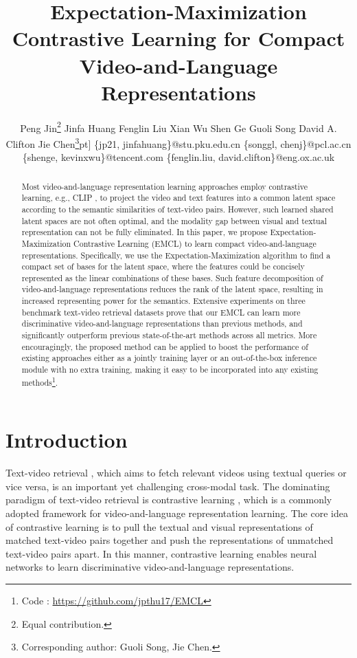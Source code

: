 \documentclass{article}
\title{Expectation-Maximization Contrastive Learning for Compact Video-and-Language Representations}
\author{Peng Jin\thanks{Equal contribution.} \quad
    Jinfa Huang \quad
    Fenglin Liu \quad
    Xian Wu \quad
    Shen Ge \quad
    Guoli Song
    \And
    David A. Clifton \quad
    Jie Chen\thanks{Corresponding author: Guoli Song, Jie Chen.}\5pt]
    \{jp21, jinfahuang\}@stu.pku.edu.cn \quad \{songgl, chenj\}@pcl.ac.cn\\
    \{shenge, kevinxwu\}@tencent.com \quad \{fenglin.liu, david.clifton\}@eng.ox.ac.uk
}
\begin{document}
\newcommand*{\dif}{\,\mathrm{d}}
\renewcommand{\thefootnote}{\fnsymbol{footnote}}
\setcounter{footnote}{0}
\maketitle

\begin{abstract}
Most video-and-language representation learning approaches employ contrastive learning, e.g., CLIP \cite{radford2021learning}, to project the video and text features into a common latent space according to the semantic similarities of text-video pairs. However, such learned shared latent spaces are not often optimal, and the modality gap between visual and textual representation can not be fully eliminated. In this paper, we propose Expectation-Maximization Contrastive Learning (EMCL) to learn compact video-and-language representations. Specifically, we use the Expectation-Maximization algorithm to find a compact set of bases for the latent space, where the features could be concisely represented as the linear combinations of these bases. Such feature decomposition of video-and-language representations reduces the rank of the latent space, resulting in increased representing power for the semantics. Extensive experiments on three benchmark text-video retrieval datasets prove that our EMCL can learn more discriminative video-and-language representations than previous methods, and significantly outperform previous state-of-the-art methods across all metrics. More encouragingly, the proposed method can be applied to boost the performance of existing approaches either as a jointly training layer or an out-of-the-box inference module with no extra training, making it easy to be incorporated into any existing methods\footnote[3]{Code : \href{https://github.com/jpthu17/EMCL}{https://github.com/jpthu17/EMCL}}.
\end{abstract}


\section{Introduction}
Text-video retrieval \cite{Yu2017Retrieval}, which aims to fetch relevant videos using textual queries or vice versa, is an important yet challenging cross-modal task. The dominating paradigm of text-video retrieval is contrastive learning \cite{wu2018unsupervised,hjelm2018learning,chen2020a,he2020momentum,chen2021an,chen2020improved}, which is a commonly adopted framework for video-and-language representation learning. The core idea of contrastive learning is to pull the textual and visual representations of matched text-video pairs together and push the representations of unmatched text-video pairs apart. In this manner, contrastive learning enables neural networks to learn discriminative video-and-language representations.
\end{document}
